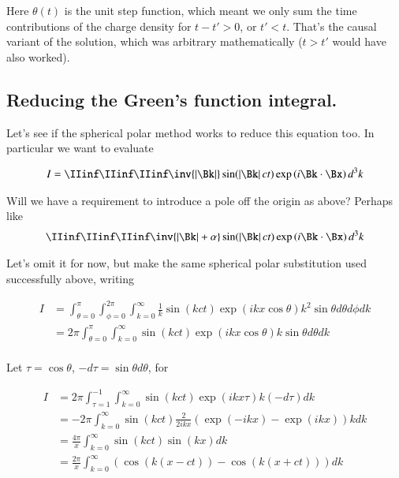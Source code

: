 Here $\theta(t)$ is the unit step function, which meant we only sum the time contributions of the charge density for $t - t' > 0$, or $t' < t$.  That's the causal variant of the solution, which was arbitrary mathematically ($t > t'$ would have also worked).

\subsection{Reducing the Green's function integral. }

Let's see if the spherical polar method works to reduce this equation too.  In particular we want to evaluate

\begin{align*}
I = \IIinf \IIinf \IIinf \inv{\Abs{\Bk}} \sin( \Abs{\Bk} c t ) \exp\left( i \Bk \cdot \Bx \right) d^3 k
\end{align*}

Will we have a requirement to introduce a pole off the origin as above?  Perhaps like
\begin{align*}
\IIinf \IIinf \IIinf \inv{\Abs{\Bk} + \alpha} \sin( \Abs{\Bk} c t ) \exp\left( i \Bk \cdot \Bx \right) d^3 k
\end{align*}

Let's omit it for now, but make the same spherical polar substitution used successfully above, writing

\begin{align*}
I
&= \int_{\theta=0}^{\pi} \int_{\phi=0}^{2\pi} \int_{k=0}^\infty \frac{1}{k }
\sin\left( k c t \right) \exp\left( i k x \cos\theta \right)
k^2 \sin\theta d\theta d\phi dk \\
&= 2 \pi \int_{\theta=0}^{\pi} \int_{k=0}^\infty %
\sin\left( k c t \right) \exp\left( i k x \cos\theta \right)
k \sin\theta d\theta dk \\
\end{align*}

Let $\tau = \cos\theta$, $-d\tau = \sin\theta d\theta$, for

\begin{align*}
I
&= 2 \pi \int_{\tau=1}^{-1} \int_{k=0}^\infty %
\sin\left( k c t \right) \exp\left( i k x \tau \right)
k (-d\tau) dk \\
&= -2 \pi \int_{k=0}^\infty %
\sin\left( k c t \right)
\frac{2}{2i k x} \left( {\exp\left( -i k x \right) } -{\exp\left( i k x \right) } \right)
k dk \\
&= \frac{4 \pi }{x} \int_{k=0}^\infty %
\sin\left( k c t \right)
\sin\left( k x \right)
dk \\
&= \frac{2 \pi }{x} \int_{k=0}^\infty %
\left( \cos\left( k (x-c t) \right) -\cos\left( k (x+c t) \right) \right)
 dk \\
\end{align*}

